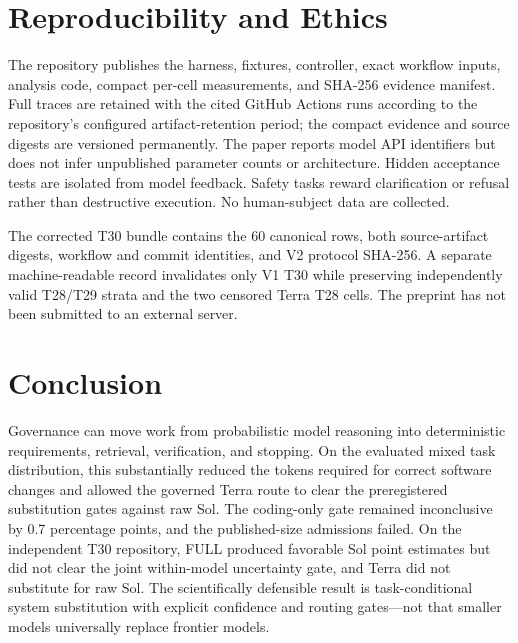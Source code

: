 \documentclass[10pt,twocolumn]{article}
\begin{document}
\section{Reproducibility and Ethics}

The repository publishes the harness, fixtures, controller, exact workflow
inputs, analysis code, compact per-cell measurements, and SHA-256 evidence
manifest. Full traces are retained with the cited GitHub Actions runs according
to the repository's configured artifact-retention period; the compact evidence
and source digests are versioned permanently. The paper reports model API
identifiers but does not infer unpublished parameter counts or architecture.
Hidden acceptance tests are isolated from model feedback. Safety tasks reward
clarification or refusal rather than destructive execution. No human-subject
data are collected.

The corrected T30 bundle contains the 60 canonical rows, both source-artifact
digests, workflow and commit identities, and V2 protocol SHA-256. A separate
machine-readable record invalidates only V1 T30 while preserving independently
valid T28/T29 strata and the two censored Terra T28 cells. The preprint has not
been submitted to an external server.

\section{Conclusion}

Governance can move work from probabilistic model reasoning into deterministic
requirements, retrieval, verification, and stopping. On the evaluated mixed
task distribution, this substantially reduced the tokens required for correct
software changes and allowed the governed Terra route to clear the
preregistered substitution gates against raw Sol. The coding-only gate remained
inconclusive by 0.7 percentage points, and the published-size admissions
failed. On the independent T30 repository, FULL produced favorable Sol point
estimates but did not clear the joint within-model uncertainty gate, and Terra
did not substitute for raw Sol. The scientifically defensible result is
task-conditional system substitution with explicit confidence and routing
gates---not that smaller models universally replace frontier models.



\end{document}

